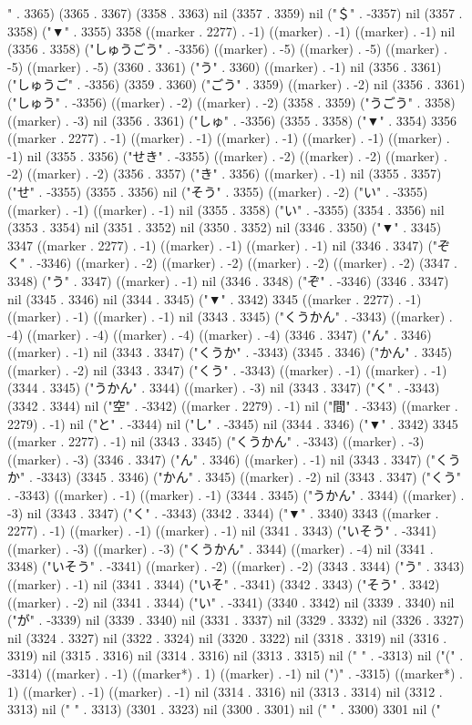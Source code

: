 " . 3365) (3365 . 3367) (3358 . 3363) nil (3357 . 3359) nil ("＄" . -3357) nil (3357 . 3358) ("▼" . 3355) 3358 ((marker . 2277) . -1) ((marker) . -1) ((marker) . -1) nil (3356 . 3358) ("しゅうごう" . -3356) ((marker) . -5) ((marker) . -5) ((marker) . -5) ((marker) . -5) (3360 . 3361) ("う" . 3360) ((marker) . -1) nil (3356 . 3361) ("しゅうご" . -3356) (3359 . 3360) ("ごう" . 3359) ((marker) . -2) nil (3356 . 3361) ("しゅう" . -3356) ((marker) . -2) ((marker) . -2) (3358 . 3359) ("うごう" . 3358) ((marker) . -3) nil (3356 . 3361) ("しゅ" . -3356) (3355 . 3358) ("▼" . 3354) 3356 ((marker . 2277) . -1) ((marker) . -1) ((marker) . -1) ((marker) . -1) ((marker) . -1) nil (3355 . 3356) ("せき" . -3355) ((marker) . -2) ((marker) . -2) ((marker) . -2) ((marker) . -2) (3356 . 3357) ("き" . 3356) ((marker) . -1) nil (3355 . 3357) ("せ" . -3355) (3355 . 3356) nil ("そう" . 3355) ((marker) . -2) ("い" . -3355) ((marker) . -1) ((marker) . -1) nil (3355 . 3358) ("い" . -3355) (3354 . 3356) nil (3353 . 3354) nil (3351 . 3352) nil (3350 . 3352) nil (3346 . 3350) ("▼" . 3345) 3347 ((marker . 2277) . -1) ((marker) . -1) ((marker) . -1) nil (3346 . 3347) ("ぞく" . -3346) ((marker) . -2) ((marker) . -2) ((marker) . -2) ((marker) . -2) (3347 . 3348) ("う" . 3347) ((marker) . -1) nil (3346 . 3348) ("ぞ" . -3346) (3346 . 3347) nil (3345 . 3346) nil (3344 . 3345) ("▼" . 3342) 3345 ((marker . 2277) . -1) ((marker) . -1) ((marker) . -1) nil (3343 . 3345) ("くうかん" . -3343) ((marker) . -4) ((marker) . -4) ((marker) . -4) ((marker) . -4) (3346 . 3347) ("ん" . 3346) ((marker) . -1) nil (3343 . 3347) ("くうか" . -3343) (3345 . 3346) ("かん" . 3345) ((marker) . -2) nil (3343 . 3347) ("くう" . -3343) ((marker) . -1) ((marker) . -1) (3344 . 3345) ("うかん" . 3344) ((marker) . -3) nil (3343 . 3347) ("く" . -3343) (3342 . 3344) nil ("空" . -3342) ((marker . 2279) . -1) nil ("間" . -3343) ((marker . 2279) . -1) nil ("と" . -3344) nil ("し" . -3345) nil (3344 . 3346) ("▼" . 3342) 3345 ((marker . 2277) . -1) nil (3343 . 3345) ("くうかん" . -3343) ((marker) . -3) ((marker) . -3) (3346 . 3347) ("ん" . 3346) ((marker) . -1) nil (3343 . 3347) ("くうか" . -3343) (3345 . 3346) ("かん" . 3345) ((marker) . -2) nil (3343 . 3347) ("くう" . -3343) ((marker) . -1) ((marker) . -1) (3344 . 3345) ("うかん" . 3344) ((marker) . -3) nil (3343 . 3347) ("く" . -3343) (3342 . 3344) ("▼" . 3340) 3343 ((marker . 2277) . -1) ((marker) . -1) ((marker) . -1) nil (3341 . 3343) ("いそう" . -3341) ((marker) . -3) ((marker) . -3) ("くうかん" . 3344) ((marker) . -4) nil (3341 . 3348) ("いそう" . -3341) ((marker) . -2) ((marker) . -2) (3343 . 3344) ("う" . 3343) ((marker) . -1) nil (3341 . 3344) ("いそ" . -3341) (3342 . 3343) ("そう" . 3342) ((marker) . -2) nil (3341 . 3344) ("い" . -3341) (3340 . 3342) nil (3339 . 3340) nil ("が" . -3339) nil (3339 . 3340) nil (3331 . 3337) nil (3329 . 3332) nil (3326 . 3327) nil (3324 . 3327) nil (3322 . 3324) nil (3320 . 3322) nil (3318 . 3319) nil (3316 . 3319) nil (3315 . 3316) nil (3314 . 3316) nil (3313 . 3315) nil (" " . -3313) nil ("(" . -3314) ((marker) . -1) ((marker*) . 1) ((marker) . -1) nil (")" . -3315) ((marker*) . 1) ((marker) . -1) ((marker) . -1) nil (3314 . 3316) nil (3313 . 3314) nil (3312 . 3313) nil (" " . 3313) (3301 . 3323) nil (3300 . 3301) nil (" " . 3300) 3301 nil ("
